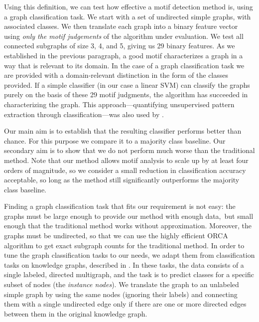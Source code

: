 \documentclass[twoside,11pt]{article}
\begin{document}
Using this definition, we can test how effective a motif detection method is, using a graph classification task. We start with a set of undirected simple graphs, with associated classes. We then translate each graph into a binary feature vector using \emph{only the motif judgements} of the algorithm under evaluation. We test all connected subgraphs of size 3, 4, and 5, giving us 29 binary features. As we established in the previous paragraph, a good motif characterizes a graph in a way that is relevant to its domain. In the case of a graph classification task we are provided with a domain-relevant distinction in the form of the classes provided. If a simple classifier (in our case a linear SVM) can classify the graphs purely on the basis of these 29 motif judgments, the algorithm has succeeded in characterizing the graph. This approach---quantifying unsupervised pattern extraction through classification---was also used by \citet{leeuwen2006compression}. 

Our main aim is to establish that the resulting classifier performs better than chance. For this purpose we compare it to a majority class baseline. Our secondary aim is to show that we do not perform much worse than the traditional method. Note that our method allows motif analysis to scale up by at least four orders of magnitude, so we consider a small reduction in classification accuracy acceptable, so long as the method still significantly outperforms the majority class baseline.

Finding a graph classification task that fits our requirement is not easy: the graphs must be large enough to provide our method with enough data,\footnotemark~but small enough that the traditional method works without approximation. Moreover, the graphs must be undirected, so that we can use the highly efficient ORCA algorithm \citep{hovcevar2014combinatorial} to get exact subgraph counts for the traditional method. In order to tune the graph classification tasks to our needs, we adapt them from classification tasks on knowledge graphs, described in \cite{ristoski2016collection}. In these tasks, the data consists of a single labeled, directed multigraph, and the task is to predict classes for a specific subset of nodes (the \emph{instance nodes}). We translate the graph to an unlabeled simple graph by using the same nodes (ignoring their labels) and connecting them with a single undirected edge only if there are one or more directed edges between them in the original knowledge graph. 

\end{document}
